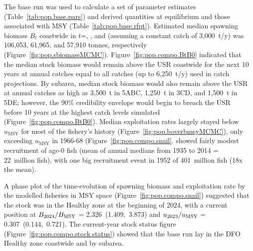 \documentclass[11pt]{book}
\newcommand{\Bmsy}{B_\text{MSY}}
\newcommand{\umsy}{u_\text{MSY}}
\newcommand{\code}[1]{\texttt{#1}}
\newcommand{\pc}{\%}
\begin{document}
The base run was used to calculate a set of parameter estimates (Table~\ref{tab:pop.base.pars}) and derived quantities at equilibrium and those associated with MSY (Table~\ref{tab:pop.base.rfpt}).
Estimated median spawning biomass $B_t$ coastwide in $t$=\startYear, \currYear, and \projYear{} (assuming a constant catch of 3,000~t/y) was 106,053, 61,965, and 57,910 tonnes, respectively (Figure~\ref{fig:pop.sbiomassMCMC}).
Figure~\ref{fig:pop.compo.BtB0} indicated that the median stock biomass would remain above the USR coastwide for the next 10 years at annual catches equal to all catches (up to 6,250~t/y) used in catch projections.
By subarea, median stock biomass would also remain above the USR at annual catches as high as 3,500~t in 5ABC, 1,250~t in 3CD, and 1,500~t in 5DE; however, the 90\pc{} credibility envelope would begin to breach the USR before 10 years at the highest catch levels simulated (Figure~\ref{fig:pop.compo.BtB0}).
Median exploitation rates largely stayed below $\umsy$ for most of the fishery's history (Figure~\ref{fig:pop.boverbmsyMCMC}), only exceeding $\umsy$ in 1966-68 (Figure~\ref{fig:pop.compo.snail}.
\SPC{} showed fairly modest recruitment of age-0 fish (mean of annual medians from 1935 to 2014 = 22~million fish), with one big recruitment event in 1952 of 401~million fish (18x the mean).

A phase plot of the time-evolution of spawning biomass and exploitation rate by the modelled fisheries in MSY space (Figure~\ref{fig:pop.compo.snail}) suggested that the stock was in the Healthy zone at the beginning of 2024, with a current position at $B_{\currYear}/\Bmsy$ = 2.326~(1.409,~3.873)
and $u_{\prevYear}/\umsy$ = 0.307~(0.144,~0.721).
The current-year stock status figure (Figure~\ref{fig:pop.compo.stock.status}) showed that the base run lay in the DFO Healthy zone coastwide and by subarea.


\newpage
\end{document}
